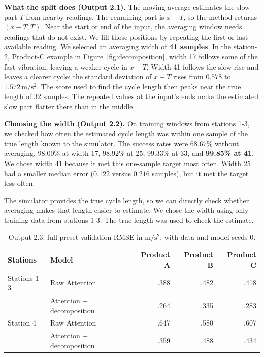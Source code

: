 \documentclass[11pt,a4paper]{article}
\begin{document}
\textbf{What the split does (Output 2.1).}
The moving average estimates the slow part $T$ from nearby readings. The
remaining part is $x-T$, so the method returns $(x-T,T)$. Near the start or end of the
input, the averaging window needs readings that do not exist. We fill those positions by 
repeating the first or last available reading. We selected an averaging width of \textbf{41 samples}.
In the station-2, Product-C example in Figure~\ref{fig:decomposition}, width
17 follows some of the fast vibration, leaving a weaker cycle in $x-T$.
Width 41 follows the slow rise and leaves a clearer cycle: the standard
deviation of $x-T$ rises from $0.578$ to $1.572\,\mathrm{m/s^2}$. The score used
to find the cycle length then peaks near the true length of 32 samples.
The repeated values at the input's ends make the estimated slow part flatter
there than in the middle.

\textbf{Choosing the width (Output 2.2).}
On training windows from stations 1-3, we checked how often the estimated
cycle length was within one sample of the true length known to the simulator.
The success rates were 68.67\% without averaging, 98.00\% at width 17, 98.92\%
at 25, 99.33\% at 33, and \textbf{99.85\% at 41}. We chose width 41 because it
met this one-sample target most often. Width 25 had a smaller median error
($0.122$ versus $0.216$ samples), but it met the target less often.

The simulator provides the true cycle length, so we can directly check whether
averaging makes that length easier to estimate. We chose the width using only
training data from stations 1-3. The true length was used to check the estimate.

\begin{table}[ht]
\centering
\small
\begin{tabular}{llrrr}
\hline
Stations & Model & Product A & Product B & Product C \\
\hline
Stations 1-3 & Raw Attention & .388 & .482 & .418 \\
& Attention + decomposition & .264 & .335 & .283 \\
Station 4 & Raw Attention & .647 & .580 & .607 \\
& Attention + decomposition & .359 & .488 & .434 \\
\hline
\end{tabular}
\caption{Output 2.3: full-preset validation RMSE in $\mathrm{m/s^2}$, with
data and model seeds 0.}
\label{tab:decomposition}
\end{table}
\end{document}
